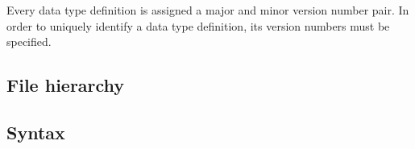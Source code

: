 Every data type definition is assigned a major and minor version number pair.
In order to uniquely identify a data type definition, its version numbers must be specified.

\subsection{File hierarchy}

\subsection{Syntax}

